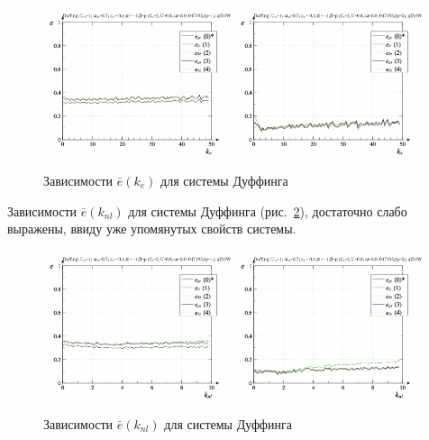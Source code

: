 \begin{figure}[ht!]
\begin{center}
  \includegraphics[width=0.49\textwidth]{p/cha/duff/duff_id-p_k_e_sign.png}
  \hfill
  \includegraphics[width=0.49\textwidth]{p/cha/duff/duff_id-p_k_e_sin.png}
\end{center}
  \caption{Зависимости $\bar{e}(k_e)$ для системы Дуффинга}
\label{atu:f:duff_e_k_e}
\end{figure}

Зависимости $\bar{e}(k_{nl})$ для системы Дуффинга
(рис.~\ref{atu:f:duff_e_k_nl}),
достаточно слабо выражены,
ввиду уже упомянутых свойств системы.


\begin{figure}[ht!]
\begin{center}
  \includegraphics[width=0.49\textwidth]{p/cha/duff/duff_id-p_k_nl_sign.png}
  \hfill
  \includegraphics[width=0.49\textwidth]{p/cha/duff/duff_id-p_k_nl_sin.png}
\end{center}
  \caption{Зависимости $\bar{e}(k_{nl})$ для системы Дуффинга}
\label{atu:f:duff_e_k_nl}
\end{figure}

